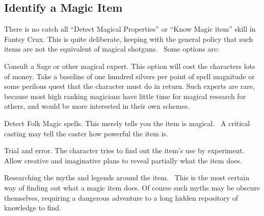 \subsection{Identify a Magic Item}
There is no catch all “Detect Magical Properties” or “Know Magic item” skill in Fantsy Crux. This is quite deliberate, keeping with the general policy that such items are not the equivalent of magical shotguns.  Some options are:

Consult a Sage or other magical expert. This option will cost the characters lots of money. Take a baseline of one hundred silvers per point of spell magnitude or some perilous quest that the character must do in return. Such experts are rare, because most high ranking magicians have little time for magical research for others, and would be more interested in their own schemes. 

Detect Folk Magic spells. This merely tells you the item is magical.  A critical casting may tell the caster how powerful the item is.

Trial and error. The character tries to find out the item’s use by experiment. Allow creative and imaginative plans to reveal partially what the item does.

Researching the myths and legends around the item.  This is the most certain way of finding out what a magic item does. Of course such myths may be obscure themselves, requiring a dangerous adventure to a long hidden repository of knowledge to find.

\vspace{6em}


